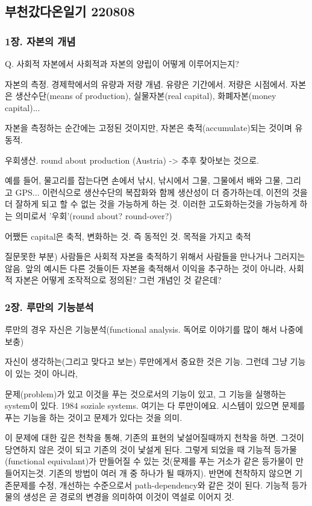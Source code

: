 \documentclass[11pt, a4paper]{article}
\begin{document}
\newpage
\subsection{부천갔다온일기 220808}
\subsubsection{1장. 자본의 개념}
Q. 사회적 자본에서 사회적과 자본의 양립이 어떻게 이루어지는지?

자본의 측정.
경제학에서의 유량과 저량 개념. 유량은 기간에서. 저량은 시점에서.
자본은 생산수단(means of production), 실물자본(real capital), 화폐자본(money capital)...

자본을 측정하는 순간에는 고정된 것이지만, 자본은 축적(accumulate)되는 것이며 유동적.

우회생산. round about production (Austria)
-> 추후 찾아보는 것으로.

예를 들어, 물고리를 잡는다면 손에서 낚시, 낚시에서 그물, 그물에서 배와 그물, 그리고 GPS... 이런식으로 생산수단의 복잡화와 함께 생산성이 더 증가하는데, 이전의 것을 더 잘하게 되고 할 수 없는 것을 가능하게 하는 것. 이러한 고도화하는것을 가능하게 하는 의미로서 '우회'(round about? round-over?)

어쨌든 capital은 축적, 변화하는 것. 즉 동적인 것. 목적을 가지고 축적

질문못한 부분) 사람들은 사회적 자본을 축적하기 위해서 사람들을 만나거나 그러지는 않음. 앞의 예시든 다른 것들이든 자본을 축적해서 이익을 추구하는 것이 아니라, 사회적 자본은 어떻게 조작적으로 정의된? 그런 개념인 것 같은데?

\subsubsection{2장. 루만의 기능분석}

루만의 경우 자신은 기능분석(functional analysis. 독어로 이야기를 많이 해서 나중에 보충)

자신이 생각하는(그리고 맞다고 보는) 루만에게서 중요한 것은 기능. 그런데 그냥 기능이 있는 것이 아니라,

문제(problem)가 있고 이것을 푸는 것으로서의 기능이 있고, 그 기능을 실행하는 system이 있다. 1984 soziale systems. 여기는 다 루만이에요. 시스템이 있으면 문제를 푸는 기능을 하는 것이고 문제가 있다는 것을 의미. 

이 문제에 대한 깊은 천착을 통해, 기존의 표현의 낯설어질때까지 천착을 하면. 그것이 당연하지 않은 것이 되고 기존의 것이 낯설게 된다. 그렇게 되었을 때 기능적 등가물(functional equivalant)가 만들어질 수 있는 것(문제를 푸는 거소가 같은 등가물이 만들어지는것. 기존의 방법이 여러 개 중 하나가 될 때까지). 반면에 천착하지 않으면 기존문제를 수정, 개선하는 수준으로서 path-dependency와 같은 것이 된다. 기능적 등가물의 생성은 곧 경로의 변경을 의미하여 이것이 역설로 이어지 것.
\end{document}
